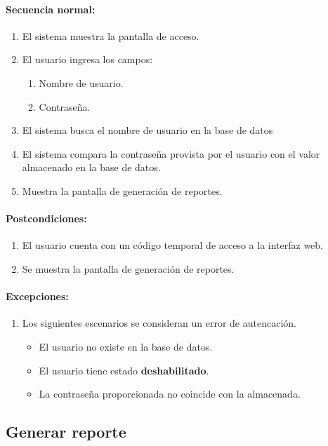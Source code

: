 \paragraph{Secuencia normal:}
\begin{enumerate}
  \item El sistema muestra la pantalla de acceso.
  \item El usuario ingresa los campos:
  \begin{enumerate}
    \item Nombre de usuario.
    \item Contraseña.
  \end{enumerate}
  \item El sistema busca el nombre de usuario en la base de datos
  \item El sistema compara la contraseña provista por el usuario con el valor almacenado en la base de datos.
  \item Muestra la pantalla de generación de reportes.
\end{enumerate}
\paragraph{Postcondiciones:}
\begin{enumerate}
  \item El usuario cuenta con un código temporal de acceso a la interfaz web.
  \item Se muestra la pantalla de generación de reportes.
\end{enumerate}
\paragraph{Excepciones:}
\begin{enumerate}
  \item Los siguientes escenarios se consideran un error de autencación.
  \begin{itemize}
    \item El usuario no existe en la base de datos.
    \item El usuario tiene estado \textbf{deshabilitado}.
    \item La contraseña proporcionada no coincide con la almacenada. 
  \end{itemize}
\end{enumerate}

\subsection{Generar reporte}\label{cu-generar-reporte}
